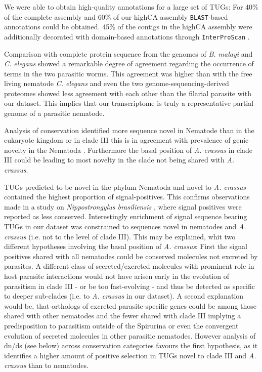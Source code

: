 \documentclass[10pt]{bmc_article}
\newenvironment{bmcformat}{\begin{raggedright}\baselineskip20pt\sloppy\setboolean{publ}{false}}{\end{raggedright}\baselineskip20pt\sloppy}
\begin{document}
\begin{bmcformat}
We were able to obtain high-quality annotations for a large set of
TUGs: For 40\% of the complete assembly and 60\% of our highCA assembly
\texttt{BLAST}-based annotations could be obtained. 45\% of the
contigs in the highCA assembly were additionally decorated with
domain-based annotations through \texttt{InterProScan}
\cite{pmid11590104}.

Comparison with complete protein sequence from the genomes of
\textit{B. malayi} and \textit{C. elegans} showed a remarkable degree
of agreement regarding the occurrence of terms in the two parasitic
worms. This agreement was higher than with the free living nematode
\textit{C. elegans} and even the two genome-sequencing-derived
proteomes showed less agreement with each other than the filarial
parasite with our dataset. This implies that our transcriptome is
truly a representative partial genome
\cite{parkinson_partigene--constructing_2004} of a parasitic nematode.

Analysis of conservation identified more sequence novel in Nematode
than in the eukaryote kingdom or in clade III this is in agreement
with prevalence of genic novelty in the Nematoda
\cite{wasmuth_extent_2008}. Furthermore the basal position of
\textit{A. crassus} in clade III could be leading to most novelty in
the clade not being shared with \textit{A. crassus}.

TUGs predicted to be novel in the phylum Nematoda and novel to
\textit{A. crassus} contained the highest proportion of
signal-positives. This confirms observations made in a study on
\textit{Nippostrongylus brasiliensis} \cite{harcus_signal_2004}, where
signal positives were reported as less conserved. Interestingly
enrichment of signal sequence bearing TUGs in our dataset was
constrained to sequences novel in nematodes and \textit{A. crassus}
(i.e. not to the level of clade III). This may be explained, whit two
different hypotheses involving the basal position of
\textit{A. crassus}: First the signal positives shared with all
nematodes could be conserved molecules not excreted by parasites. A
different class of secreted/excreted molecules with prominent role in
host parasite interactions would not have arisen early in the
evolution of parasitism in clade III - or be too fast-evolving - and
thus be detected as specific to deeper sub-clades (i.e. to
\textit{A. crassus} in our dataset). A second explanation would be,
that orthologs of excreted parasite-specific genes could be among
those shared with other nematodes and the fewer shared with clade III
implying a predisposition to parasitism outside of the Spirurina or
even the convergent evolution of secreted molecules in other parasitic
nematodes. However analysis of dn/ds (see below) across conservation
categories favours the first hypothesis, as it identifies a higher
amount of positive selection in TUGs novel to clade III and
\textit{A. crassus} than to nematodes.


\end{bmcformat}
\end{document}
